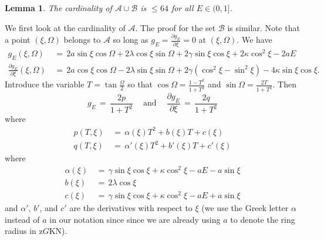 \documentclass[11 pt]{article}
\newtheorem{lem}[thm]{Lemma}%
\renewcommand\({\left(}
\renewcommand\){\right)}
\newcommand\<{\langle}
\renewcommand\>{\rangle}
\newcommand\8{\infty}
\renewcommand\a{\alpha}
\newcommand{\pd}{\partial}
\newcommand{\mc}{\mathcal}
\begin{document}
\medskip
\medskip

\begin{lem}\label{resultant lem}
The cardinality of $\mc{A} \cup \mc{B}$ is $\leq 64$ for all $E \in (0,1]$.  
\end{lem}


\proof
We first look at the cardinality of $\mc{A}$. The proof for the set $\mc{B}$ is similar. Note that a point $(\xi, \Omega)$ belongs to $\mc{A}$ so long as $g_E = \frac{\pd g_E}{\pd \xi} = 0$ at $(\xi, \Omega)$. We have
\begin{align*}
g_E(\xi, \Omega) \,&=\, 2a\sin \xi \cos \Omega + 2\lambda \cos \xi \sin\Omega + 2\gamma \sin \xi \cos \xi + 2\kappa\cos^2\xi -2aE
\\
\frac{\pd g_E}{\pd \xi}(\xi, \Omega) \,&=\, 2a\cos\xi\cos \Omega -2\lambda\sin \xi \sin \Omega + 2\gamma (\cos^2\xi - \sin^2\xi)  - 4\kappa\sin \xi \cos \xi. 
\end{align*}
Introduce the variable $T = \tan \frac{\Omega}{2}$ so that $\cos\Omega = \frac{1-T^2}{1+T^2}$ and $\sin \Omega = \frac{2T}{1+T^2}$. Then 
\[
g_E \,=\, \frac{2p}{1 + T^2} \:\:\:\: \text{ and } \:\:\:\: \frac{\pd g_E}{\pd \xi} \,=\, \frac{2q}{1 + T^2}
\]
where
\begin{align*}
p(T, \xi) \,&=\, \a(\xi)T^2 + b(\xi)T + c(\xi)
\\
q(T,\xi) \,&=\, \a'(\xi)T^2 + b'(\xi)T + c'(\xi)
\end{align*}
where
\begin{align*}
\a(\xi) \,&=\, \gamma \sin \xi \cos \xi + \kappa\cos^2\xi - aE - a\sin \xi
\\
b(\xi) \,&=\, 2\lambda \cos \xi 
\\
c(\xi) \,&=\, \gamma \sin \xi \cos \xi + \kappa\cos^2\xi - aE + a\sin\xi
\end{align*}
and $\a'$, $b'$, and $c'$ are the derivatives with respect to $\xi$ (we use the Greek letter $\a$ instead of $a$ in our notation since since we are already using $a$ to denote the ring radius in z$G$KN). 
\end{document}
